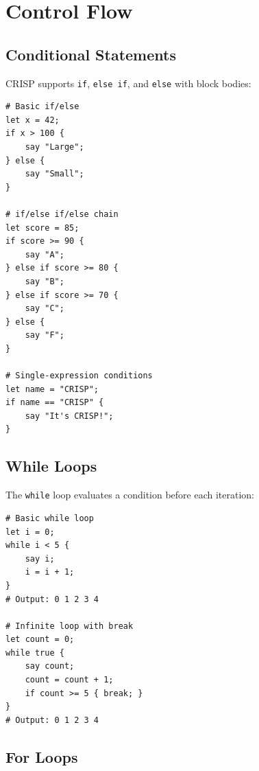 \section{Control Flow}

\subsection{Conditional Statements}

CRISP supports \texttt{if}, \texttt{else if}, and \texttt{else} with block bodies:

\begin{tcolorbox}[colback=codebg, colframe=darkpurple, colbacktitle=darkpurple, title=\textbf{\textcolor{codegold}{Conditional Statements}}, fonttitle=\bfseries, sharp corners]
\begin{lstlisting}
# Basic if/else
let x = 42;
if x > 100 {
    say "Large";
} else {
    say "Small";
}

# if/else if/else chain
let score = 85;
if score >= 90 {
    say "A";
} else if score >= 80 {
    say "B";
} else if score >= 70 {
    say "C";
} else {
    say "F";
}

# Single-expression conditions
let name = "CRISP";
if name == "CRISP" {
    say "It's CRISP!";
}
\end{lstlisting}
\end{tcolorbox}

\subsection{While Loops}

The \texttt{while} loop evaluates a condition before each iteration:

\begin{tcolorbox}[colback=codebg, colframe=darkpurple, colbacktitle=darkpurple, title=\textbf{\textcolor{codegold}{While Loops}}, fonttitle=\bfseries, sharp corners]
\begin{lstlisting}
# Basic while loop
let i = 0;
while i < 5 {
    say i;
    i = i + 1;
}
# Output: 0 1 2 3 4

# Infinite loop with break
let count = 0;
while true {
    say count;
    count = count + 1;
    if count >= 5 { break; }
}
# Output: 0 1 2 3 4
\end{lstlisting}
\end{tcolorbox}

\subsection{For Loops}

